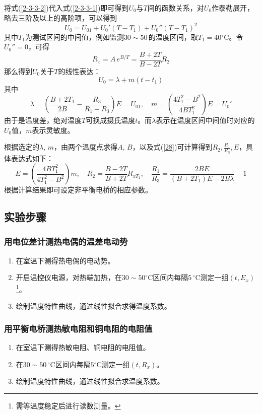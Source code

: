\documentclass[UTF8]{article}
\theoremstyle{MyLineTheoremStyle} %
\theoremstyle{MyBlockTheoremStyle} %
\theoremstyle{MySubsubsectionStyle} %
\begin{document}
将式(\ref{2-3-3-2})代入式(\ref{2-3-3-1})即可得到$ U_0 $与$ T $间的函数关系，对$ U_0 $作泰勒展开，略去三阶及以上的高阶项，可以得到
\begin{equation}
U_0=U_{01}+U_0'(T-T_1)+U_0''(T-T_1)^2
\end{equation}
其中$ T_1 $为测试区间的中间值，例如监测$ 30\sim 50 $\,\textcelsius 的温度区间，取$ T_1=40\mathrm{^\circ C} $。令$ U_0''=0 $，可得
\begin{equation}\label{28}
    R_x=A\,e^{B/T}=\frac{B+2T}{B-2T}R_2
\end{equation}
那么得到$ U_0 $关于$ T $的线性表达：
\begin{equation}
U_0=\lambda+m(t-t_1)
\end{equation}
其中
\begin{equation}
\lambda=\left(\frac{B+2T_1}{2B}-\frac{R_3}{R_1+R_3}\right)E=U_{01},\quad m=\left(\frac{4T_1^2-B^2}{4BT_1^2}\right)E=U_0'
\end{equation}
由于是温度差，绝对温度$ T $可换成摄氏温度$ t $。而$ \lambda $表示在温度区间中间值时对应的$ U_0 $值，$ m $表示灵敏度。


根据选定的$ \lambda,\,m $，由两个温度点求得$ A,\,B $，以及式(\ref{28})可计算得到$ R_2,\frac{R_1}{R_3},E $，具体表达式如下：
\begin{equation}
E=\left(\frac{4BT_1^2}{4T_1^2-B^2}\right)m,\quad R_2=\frac{B-2T}{B+2T}R_{xT_1},\quad\frac{R_1}{R_3}=\frac{2BE}{(B+2T_1)E-2B\lambda}-1
\end{equation}
根据计算结果即可设定非平衡电桥的相应参数。

\subsection{实验步骤}
\subsubsection{用电位差计测热电偶的温差电动势}
\begin{enumerate}
\item 在室温下测得热电偶的电动势。
\item 开启温控仪电源，对热端加热，在$ 30\sim 50\mathrm{^\circ C} $区间内每隔$ 5\,\mathrm{^\circ C} $测定一组$ (t,E_x) $\footnote{需等温度稳定后进行读数测量。}。
\item 绘制温度特性曲线，通过线性拟合求得温度系数。
\end{enumerate}

\subsubsection{用平衡电桥测热敏电阻和铜电阻的电阻值}
\begin{enumerate}
\item 在室温下测得热敏电阻、铜电阻的电阻值。
\item 在$ 30\sim 50\,\mathrm{^\circ C} $区间内每隔$ 5\mathrm{^\circ C} $测定一组$ (t,R_x) $。
\item 绘制温度特性曲线，通过线性拟合求温度系数。
\end{enumerate}
\end{document}
